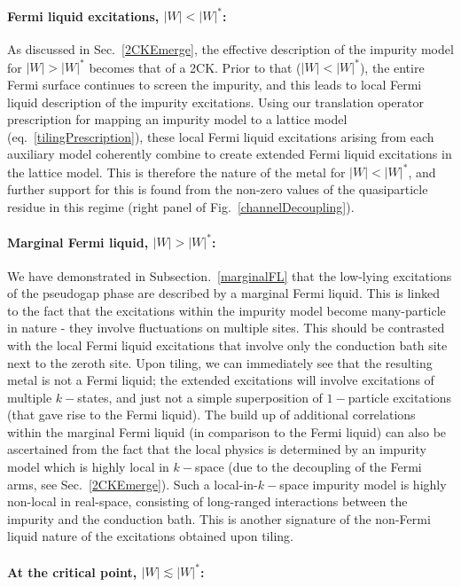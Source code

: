 \documentclass[reprint,hidelinks,onecolumn]{revtex4-2}
\begin{document}
\paragraph{Fermi liquid excitations, \(|W| < |W|^*\):}
As discussed in Sec.~\ref{2CKEmerge}, the effective description of the impurity model for \(|W| > |W|^*\) becomes that of a 2CK. Prior to that (\(|W| < |W|^*\)), the entire Fermi surface continues to screen the impurity, and this leads to local Fermi liquid description of the impurity excitations. Using our translation operator prescription for mapping an impurity model to a lattice model (eq.~\ref{tilingPrescription}), these local Fermi liquid excitations arising from each auxiliary model coherently combine to create extended Fermi liquid excitations in the lattice model. This is therefore the nature of the metal for \(|W| < |W|^*\), and further support for this is found from the non-zero values of the quasiparticle residue in this regime (right panel of Fig.~\ref{channelDecoupling}).

\paragraph{Marginal Fermi liquid, \(|W| > |W|^*\):}
We have demonstrated in Subsection.~\ref{marginalFL} that the low-lying excitations of the pseudogap phase are described by a marginal Fermi liquid. This is linked to the fact that the excitations within the impurity model become many-particle in nature - they involve fluctuations on multiple sites. This should be contrasted with the local Fermi liquid excitations that involve only the conduction bath site next to the zeroth site. Upon tiling, we can immediately see that the resulting metal is not a Fermi liquid; the extended excitations will involve excitations of multiple \(k-\)states, and just not a simple superposition of \(1-\)particle excitations (that gave rise to the Fermi liquid). The build up of additional correlations within the marginal Fermi liquid (in comparison to the Fermi liquid) can also be ascertained from the fact that the local physics is determined by an impurity model which is highly local in \(k-\)space (due to the decoupling of the Fermi arms, see Sec.~\ref{2CKEmerge}). Such a local-in-\(k-\)space impurity model is highly non-local in real-space, consisting of long-ranged interactions between the impurity and the conduction bath. This is another signature of the non-Fermi liquid nature of the excitations obtained upon tiling.

\paragraph{At the critical point, \(|W| \lesssim |W|^*\):}
\end{document}
